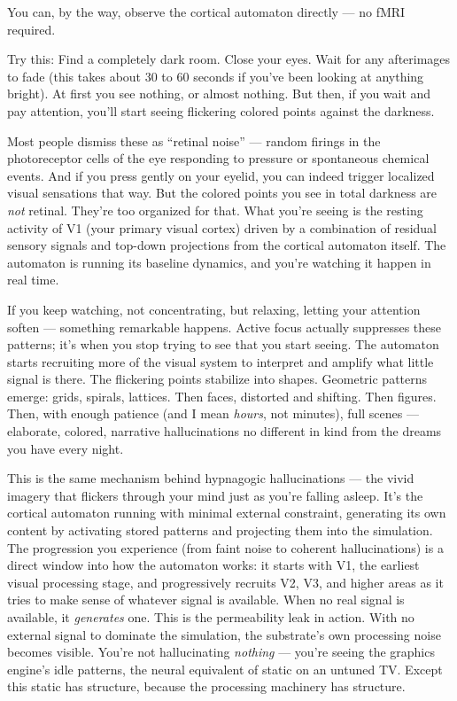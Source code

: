 \documentclass[11pt, twoside, openright]{book}
\begin{document}
You can, by the way, observe the cortical automaton directly --- no fMRI required.

Try this: Find a completely dark room. Close your eyes. Wait for any afterimages to fade (this takes about 30 to 60 seconds if you've been looking at anything bright). At first you see nothing, or almost nothing. But then, if you wait and pay attention, you'll start seeing flickering colored points against the darkness.

Most people dismiss these as ``retinal noise'' --- random firings in the photoreceptor cells of the eye responding to pressure or spontaneous chemical events. And if you press gently on your eyelid, you can indeed trigger localized visual sensations that way. But the colored points you see in total darkness are \textit{not} retinal. They're too organized for that. What you're seeing is the resting activity of V1 (your primary visual cortex) driven by a combination of residual sensory signals and top-down projections from the cortical automaton itself. The automaton is running its baseline dynamics, and you're watching it happen in real time.

If you keep watching, not concentrating, but relaxing, letting your attention soften --- something remarkable happens. Active focus actually suppresses these patterns; it's when you stop trying to see that you start seeing. The automaton starts recruiting more of the visual system to interpret and amplify what little signal is there. The flickering points stabilize into shapes. Geometric patterns emerge: grids, spirals, lattices. Then faces, distorted and shifting. Then figures. Then, with enough patience (and I mean \textit{hours}, not minutes), full scenes --- elaborate, colored, narrative hallucinations no different in kind from the dreams you have every night.

This is the same mechanism behind hypnagogic hallucinations --- the vivid imagery that flickers through your mind just as you're falling asleep. It's the cortical automaton running with minimal external constraint, generating its own content by activating stored patterns and projecting them into the simulation. The progression you experience (from faint noise to coherent hallucinations) is a direct window into how the automaton works: it starts with V1, the earliest visual processing stage, and progressively recruits V2, V3, and higher areas as it tries to make sense of whatever signal is available. When no real signal is available, it \textit{generates} one. This is the permeability leak in action. With no external signal to dominate the simulation, the substrate's own processing noise becomes visible. You're not hallucinating \textit{nothing} --- you're seeing the graphics engine's idle patterns, the neural equivalent of static on an untuned TV. Except this static has structure, because the processing machinery has structure.
\end{document}

